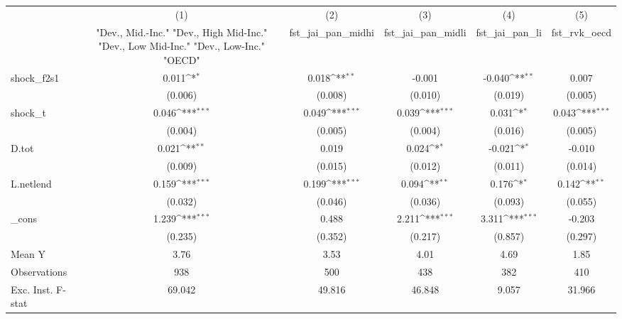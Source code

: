 {
\def\sym#1{\ifmmode^{#1}\else\(^{#1}\)\fi}
\begin{tabular}{l*{5}{c}}
\toprule
            &\multicolumn{1}{c}{(1)}&\multicolumn{1}{c}{(2)}&\multicolumn{1}{c}{(3)}&\multicolumn{1}{c}{(4)}&\multicolumn{1}{c}{(5)}\\
            &\multicolumn{1}{c}{ "Dev., Mid.-Inc." "Dev., High Mid-Inc." "Dev., Low Mid-Inc." "Dev., Low-Inc." "OECD" }&\multicolumn{1}{c}{fst\_jai\_pan\_midhi}&\multicolumn{1}{c}{fst\_jai\_pan\_midli}&\multicolumn{1}{c}{fst\_jai\_pan\_li}&\multicolumn{1}{c}{fst\_rvk\_oecd}\\
\midrule
shock\_f2s1  &       0.011\sym{*}  &       0.018\sym{**} &      -0.001         &      -0.040\sym{**} &       0.007         \\
            &     (0.006)         &     (0.008)         &     (0.010)         &     (0.019)         &     (0.005)         \\
\addlinespace
shock\_t     &       0.046\sym{***}&       0.049\sym{***}&       0.039\sym{***}&       0.031\sym{*}  &       0.043\sym{***}\\
            &     (0.004)         &     (0.005)         &     (0.004)         &     (0.016)         &     (0.005)         \\
\addlinespace
D.tot       &       0.021\sym{**} &       0.019         &       0.024\sym{*}  &      -0.021\sym{*}  &      -0.010         \\
            &     (0.009)         &     (0.015)         &     (0.012)         &     (0.011)         &     (0.014)         \\
\addlinespace
L.netlend   &       0.159\sym{***}&       0.199\sym{***}&       0.094\sym{**} &       0.176\sym{*}  &       0.142\sym{**} \\
            &     (0.032)         &     (0.046)         &     (0.036)         &     (0.093)         &     (0.055)         \\
\addlinespace
\_cons      &       1.239\sym{***}&       0.488         &       2.211\sym{***}&       3.311\sym{***}&      -0.203         \\
            &     (0.235)         &     (0.352)         &     (0.217)         &     (0.857)         &     (0.297)         \\
\midrule
Mean Y      &        3.76         &        3.53         &        4.01         &        4.69         &        1.85         \\
Observations&         938         &         500         &         438         &         382         &         410         \\
Exc. Inst. F-stat&      69.042         &      49.816         &      46.848         &       9.057         &      31.966         \\
\bottomrule
\end{tabular}
}
